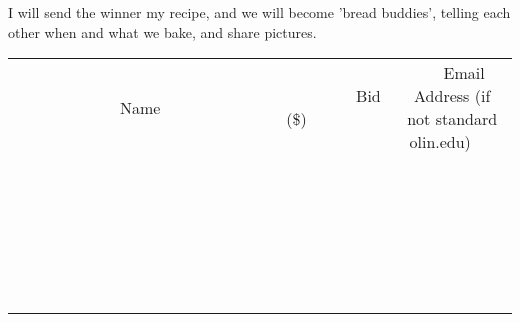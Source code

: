 \documentclass[11pt]{article}
\begin{document}
I will send the winner my recipe, and we will become 'bread buddies', telling each other when and what we bake, and share pictures. \\[6ex]
\begin{tabular}{c c c}
~~~~~~~~~~~~~Name~~~~~~~~~~~~~ & ~~~~~~~~~Bid (\$)~~~~~~~~~ & ~~~Email Address (if not standard olin.edu)~~~ \\
 & & \\
\hline
 & & \\
\hline
 & & \\
\hline
 & & \\
\hline
 & & \\
\hline
 & & \\
\hline
 & & \\
\hline
 & & \\
\hline
 & & \\
\hline
 & & \\
\hline
 & & \\
\hline
 & & \\
\hline
 & & \\
\hline
 & & \\
\hline
 & & \\
\hline
 & & \\
\hline
 & & \\
\hline
 & & \\
\hline
 & & \\
\hline
 & & \\
\hline
 & & \\
\hline
 & & \\
\hline
 & & \\
\hline
 & & \\
\hline
 & & \\
\hline
 & & \\
\hline
\end{tabular}
\clearpage
\end{document}
